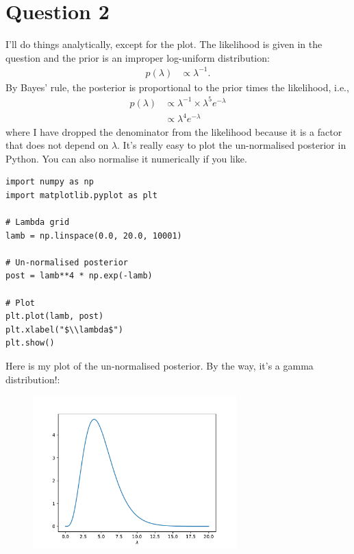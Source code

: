 \documentclass[a4paper, 12pt]{article}
\begin{document}
\section*{Question 2}
I'll do things analytically, except for the plot. The likelihood
is given in the question and the prior is an improper log-uniform
distribution:
\begin{align}
p(\lambda) &\propto \lambda^{-1}.
\end{align}
By Bayes' rule, the posterior is proportional to the prior times
the likelihood, i.e.,
\begin{align}
p(\lambda) &\propto \lambda^{-1} \times \lambda^5 e^{-\lambda} \\
           &\propto \lambda^4 e^{-\lambda}
\end{align}
where I have dropped the denominator from the likelihood because it
is a factor that does not depend on $\lambda$.
It's really easy to plot the un-normalised posterior in
Python. You can also normalise it numerically if you like.

\begin{verbatim}
import numpy as np
import matplotlib.pyplot as plt

# Lambda grid
lamb = np.linspace(0.0, 20.0, 10001)

# Un-normalised posterior
post = lamb**4 * np.exp(-lamb)

# Plot
plt.plot(lamb, post)
plt.xlabel("$\\lambda$")
plt.show()
\end{verbatim}

Here is my plot of the un-normalised posterior.
By the way, it's a gamma distribution!:

\begin{figure}[!ht]
\centering
\includegraphics[width=0.7\textwidth]{gamma.pdf}
\end{figure}
\end{document}
